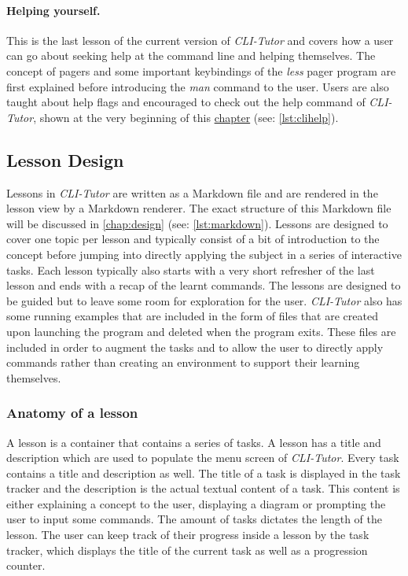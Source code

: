 \paragraph{Helping yourself.} This is the last lesson of the current version of
\textit{CLI-Tutor} and covers how a user can go about seeking help at the
command line and helping themselves. The concept of pagers and some important
keybindings of the \textit{less} pager program are first explained before
introducing the \textit{man} command to the user. Users are also taught about
help flags and encouraged to check out the help command of \textit{CLI-Tutor},
shown at the very beginning of this \hyperref[chap:clitutor]{chapter} (see:
\autoref{lst:clihelp}).

\subsection{Lesson Design}
Lessons in \textit{CLI-Tutor} are written as a Markdown file and are rendered
in the lesson view by a Markdown renderer. The exact structure of this Markdown
file will be discussed in \autoref{chap:design} (see: \autoref{lst:markdown}).
Lessons are designed to cover one topic per lesson and typically consist of a
bit of introduction to the concept before jumping into directly applying the
subject in a series of interactive tasks. Each lesson typically also starts
with a very short refresher of the last lesson and ends with a recap of the
learnt commands. The lessons are designed to be guided but to leave some room
for exploration for the user. \textit{CLI-Tutor} also has some running examples
that are included in the form of files that are created upon launching the
program and deleted when the program exits. These files are included in order
to augment the tasks and to allow the user to directly apply commands rather
than creating an environment to support their learning themselves.

\subsubsection{Anatomy of a lesson} A lesson is a container that contains a
series of tasks. A lesson has a title and description which are used to
populate the menu screen of \textit{CLI-Tutor}. Every task contains a title and
description as well. The title of a task is displayed in the task tracker and
the description is the actual textual content of a task. This content is either
explaining a concept to the user, displaying a diagram or prompting the user to
input some commands. The amount of tasks dictates the length of the lesson. The
user can keep track of their progress inside a lesson by the task tracker,
which displays the title of the current task as well as a progression counter.

